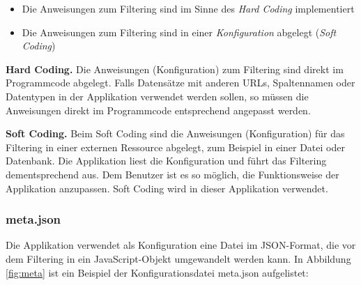 \begin{itemize}
	\item Die Anweisungen zum Filtering sind im Sinne des \textit{Hard Coding} implementiert
	\item Die Anweisungen zum Filtering sind in einer \textit{Konfiguration} abgelegt (\textit{Soft Coding})
\end{itemize}

\textbf{Hard Coding.} Die Anweisungen (Konfiguration) zum Filtering sind direkt im Programmcode abgelegt. Falls Datensätze mit anderen URLs, Spaltennamen oder Datentypen in der Applikation verwendet werden sollen, so müssen die Anweisungen direkt im Programmcode entsprechend angepasst werden.

\textbf{Soft Coding.} Beim Soft Coding sind die Anweisungen (Konfiguration) für das Filtering in einer externen Ressource abgelegt, zum Beispiel in einer Datei oder Datenbank. Die Applikation liest die Konfiguration und führt das Filtering dementsprechend aus. Dem Benutzer ist es so möglich, die Funktionsweise der Applikation anzupassen. Soft Coding wird in dieser Applikation verwendet.

\subsubsection{meta.json}

Die Applikation verwendet als Konfiguration eine Datei im JSON-Format, die vor dem Filtering in ein JavaScript-Objekt umgewandelt werden kann. In Abbildung \ref{fig:meta} ist ein Beispiel der Konfigurationsdatei meta.json aufgelistet:

